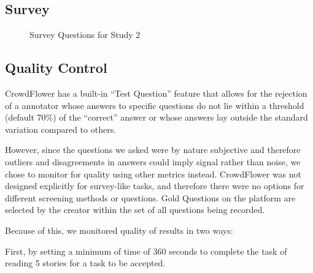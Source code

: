  
\subsection{Survey}


\begin{figure}[h!] 
\centering
  \caption{Survey Questions for Study 2}
\end{figure}









\subsection{Quality Control}

CrowdFlower has a built-in ``Test Question'' feature that allows for the rejection of a annotator whose answers to specific questions do not lie within a threshold (default 70\%) of the ``correct'' answer or whose answers lay outside the standard variation compared to others.

However, since the questions we asked were by nature subjective and therefore outliers and disagreements in answers could imply signal rather than noise, we chose to monitor for quality using other metrics instead. CrowdFlower was not designed explicitly for survey-like tasks, and therefore there were no options for different screening methods or questions. Gold Questions on the platform are selected by the creator within the set of all questions being recorded.

Because of this, we monitored quality of results in two ways:

First, by setting a minimum of time of 360 seconds to complete the task of reading 5 stories for a task to be accepted.

